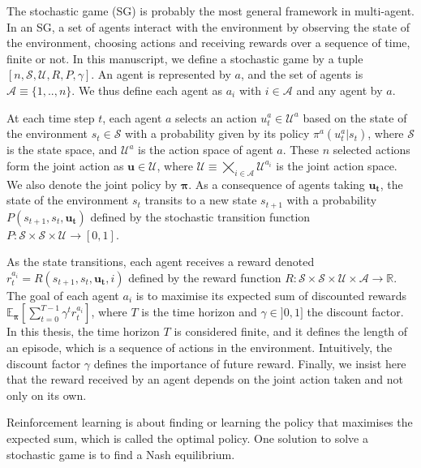 
The stochastic game (SG) \citep{stochasticGames} is probably the most general framework in multi-agent.
In an SG, a set of agents interact with the environment by observing the state of the environment, choosing actions and receiving rewards over a sequence of time, finite or not.
In this manuscript, we define a stochastic game by a tuple $[n, \mathcal{S}, \mathcal{U}, R, P, \gamma]$.
An agent is represented by $a$, and the set of agents is $\mathcal{A} \equiv \{1,..,n\}$.
We thus define each agent as $a_i$ with $i \in \mathcal{A}$ and any agent by $a$.

At each time step $t$, each agent $a$ selects an action $u_t^a \in \mathcal{U}^a$ based on the state of the environment $s_t \in \mathcal{S}$ with a probability given by its policy $\pi^a(u^a_t|s_t)$, where $\mathcal{S}$ is the state space, and $\mathcal{U}^a$ is the action space of agent $a$.
These $n$ selected actions form the joint action as $\mathbf{u} \in \mathcal{U}$, where $\mathcal{U} \equiv \bigtimes_{i \in \mathcal{A}} \mathcal{U}^{a_i}$ is the joint action space.
We also denote the joint policy by $\mathbf{\pi}$.
As a consequence of agents taking $\mathbf{u_t}$, the state of the environment $s_t$ transits to a new state $s_{t+1}$ with a probability $P(s_{t+1}, s_t, \mathbf{u_t})$ defined by the stochastic transition function $P:\mathcal{S} \times \mathcal{S} \times \mathcal{U} \rightarrow [0,1]$.

As the state transitions, each agent receives a reward denoted $r_t^{a_i} = R(s_{t+1}, s_t, \mathbf{u_t}, i)$ defined by the reward function $R: \mathcal{S} \times \mathcal{S} \times \mathcal{U} \times \mathcal{A} \rightarrow \mathbb{R}$.
The goal of each agent $a_i$ is to maximise its expected sum of discounted rewards $\mathbb{E}_{\mathbf{\pi}}\left[ \sum_{t=0}^{T-1} \gamma^t r^{a_i}_t \right]$, where $T$ is the time horizon and $\gamma \in ]0, 1]$ the discount factor.
In this thesis, the time horizon $T$ is considered finite, and it defines the length of an episode, which is a sequence of actions in the environment.
Intuitively, the discount factor $\gamma$ defines the importance of future reward.
Finally, we insist here that the reward received by an agent depends on the joint action taken and not only on its own.

Reinforcement learning is about finding or learning the policy that maximises the expected sum, which is called the optimal policy.
One solution to solve a stochastic game is to find a Nash equilibrium.

